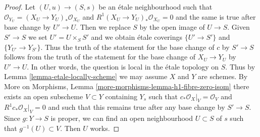 \documentclass[10pt,a4paper]{amsart}
\theoremstyle{plain}
\theoremstyle{definition}
\theoremstyle{remark}
\numberwithin{equation}{subsection}
\begin{document}
\begin{proof}
Let $(U, u) \to (S, s)$ be an \'etale neighbourhood such that
$\mathcal{O}_{Y_U} = (X_U \to Y_U)_*\mathcal{O}_{X_U}$ and
$R^1(X_U \to Y_U)_*\mathcal{O}_{X_U} = 0$ and the same is true
after base change by $U' \to U$. Then we replace $S$ by the
open image of $U \to S$. Given $S' \to S$ we set $U' = U \times_S S'$
and we obtain \'etale coverings $\{U' \to S'\}$ and
$\{Y_{U'} \to Y_{S'}\}$. Thus the truth of the statement for
the base change of $c$ by $S' \to S$ follows from the truth
of the statement for the base change of $X_U \to Y_U$ by
$U' \to U$. In other words, the question is local in the
\'etale topology on $S$.
Thus by Lemma \ref{lemma-etale-locally-scheme} we may assume
$X$ and $Y$ are schemes. By
More on Morphisms, Lemma \ref{more-morphisms-lemma-h1-fibre-zero-isom}
there exists an open subscheme $V \subset Y$ containing $Y_s$
such that $c_*\mathcal{O}_X|_V = \mathcal{O}_V$ and
$R^1c_*\mathcal{O}_X|_V = 0$ and such that this remains true after
any base change by $S' \to S$. Since $g : Y \to S$ is proper, we can
find an open neighbourhood $U \subset S$ of $s$ such that
$g^{-1}(U) \subset V$. Then $U$ works.
\end{proof}
\end{document}
